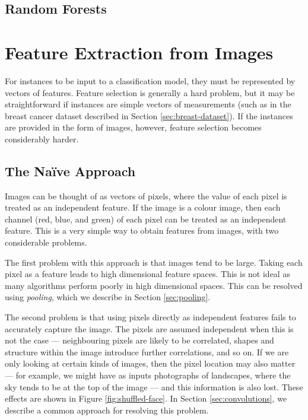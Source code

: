     \subsection{Random Forests}
    \label{sec:random-forests}


\section{Feature Extraction from Images}
\label{sec:image-features}
    
    For instances to be input to a classification model, they must be
    represented by vectors of features. Feature selection is generally a hard
    problem, but it may be straightforward if instances are simple vectors of
    measurements (such as in the breast cancer dataset described in Section
    \ref{sec:breast-dataset}). If the instances are provided in the form of
    images, however, feature selection becomes considerably harder.

    \subsection{The Na\"ive Approach}
    \label{sec:naive-approach-image-features}

        Images can be thought of as vectors of pixels, where the value of each
        pixel is treated as an independent feature. If the image is a colour
        image, then each channel (red, blue, and green) of each pixel can be
        treated as an independent feature. This is a very simple way to obtain
        features from images, with two considerable problems.

        The first problem with this approach is that images tend to be large.
        Taking each pixel as a feature leads to high dimensional feature spaces.
        This is not ideal as many algorithms perform poorly in high dimensional
        spaces. This can be resolved using \emph{pooling}, which we describe in
        Section \ref{sec:pooling}.

        The second problem is that using pixels directly as independent features
        fails to accurately capture the image. The pixels are assumed
        independent when this is not the case --- neighbouring pixels are likely
        to be correlated, shapes and structure within the image introduce
        further correlations, and so on. If we are only looking at certain kinds
        of images, then the pixel location may also matter --- for example, we
        might have as inputs photographs of landscapes, where the sky tends to
        be at the top of the image --- and this information is also lost. These
        effects are shown in Figure \ref{fig:shuffled-face}. In Section
        \ref{sec:convolutions}, we describe a common approach for resolving this
        problem.

